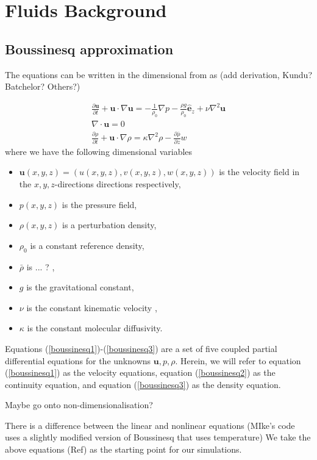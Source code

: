 \chapter{Fluids Background}
\section{Boussinesq approximation}


The equations can be written in the dimensional from as (add derivation, Kundu? Batchelor? Others?)

\begin{align}
\frac{\partial \bm{u}}{\partial t} + \bm{u}\cdot \nabla \bm{u} = -\frac{1}{\rho_{0}}\nabla p - \frac{\rho g}{\rho_{0}}\hat{\bm{e}}_{z} + \nu \nabla^{2}\bm{u} \label{boussinesq1}\\
\nabla \cdot \bm{u} =0 \label{boussinesq2}\\
\frac{\partial \rho}{\partial t} + \bm{u}\cdot \nabla \rho = \kappa \nabla^{2}\rho - \frac{\partial \bar{\rho}}{\partial z} w\label{boussinesq3}
\end{align}
where we have the following dimensional variables
\begin{itemize}
\item $\textbf{u}(x,y,z)=(u(x,y,z),v(x,y,z),w(x,y,z))$ is the velocity field in the $x,y,z$-directions directions respectively,
\item $p(x,y,z)$ is the pressure field,
\item $\rho(x,y,z)$ is a perturbation density,
\item $\rho_{0}$ is a constant reference density,
\item $\bar{\rho}$ is ... ? ,
\item $g$ is the gravitational constant,
\item $\nu$ is the constant kinematic velocity ,
\item $\kappa$ is the constant molecular diffusivity.
\end{itemize}
Equations (\ref{boussinesq1})-(\ref{boussinesq3}) are a set of five coupled partial differential equations for the unknowns $\textbf{u},p,\rho$. Herein, we will refer to equation (\ref{boussinesq1}) as the velocity equations, equation (\ref{boussinesq2}) as the continuity equation, and equation (\ref{boussinesq3}) as the density equation. 

Maybe go onto non-dimensionalisation? 

There is a difference between the linear and nonlinear equations (MIke's code uses a slightly modified version of Boussinesq that uses temperature) 
We take the above equations (Ref) as the starting point for our simulations. 

